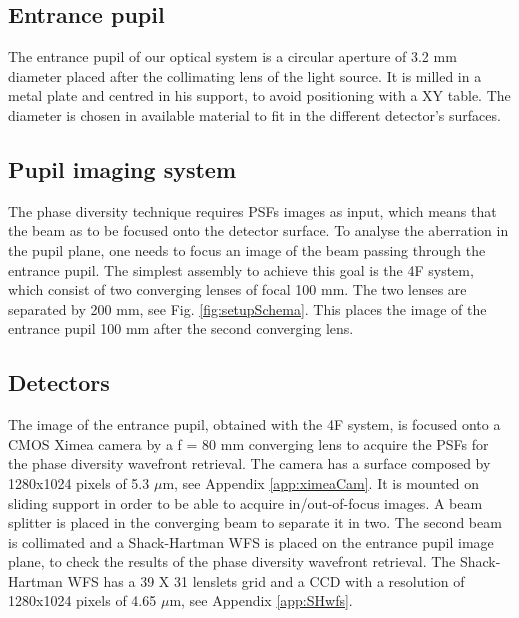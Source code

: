 \subsection{Entrance pupil}

The entrance pupil of our optical system is a circular aperture of 3.2 mm diameter placed after the collimating lens of the light source. It is milled in a metal plate and centred in his support, to avoid positioning with a XY table. The diameter is chosen in available material to fit in the different detector's surfaces.

\subsection{Pupil imaging system}

The phase diversity technique requires PSFs images as input, which means that the beam as to be focused onto the detector surface. To analyse the aberration in the pupil plane, one needs to focus an image of the beam passing through the entrance pupil. The simplest assembly to achieve this goal is the 4F system, which consist of two converging lenses of focal 100 mm. The two lenses are separated by 200 mm, see Fig. \ref{fig:setupSchema}. This places the image of the entrance pupil 100 mm after the second converging lens.

\subsection{Detectors}

The image of the entrance pupil, obtained with the 4F system, is focused onto a CMOS Ximea camera by a f = 80 mm converging lens to acquire the PSFs for the phase diversity wavefront retrieval. The camera has a surface composed by 1280x1024 pixels of 5.3 $\mu$m, see Appendix \ref{app:ximeaCam}. It is mounted on sliding support in order to be able to acquire in/out-of-focus images. A beam splitter is placed in the converging beam to separate it in two. The second beam is collimated and a Shack-Hartman WFS is placed on the entrance pupil image plane, to check the results of the phase diversity wavefront retrieval. The Shack-Hartman WFS has a 39 X 31 lenslets grid and a CCD with a resolution of 1280x1024 pixels of 4.65 $\mu$m, see Appendix \ref{app:SHwfs}. 



